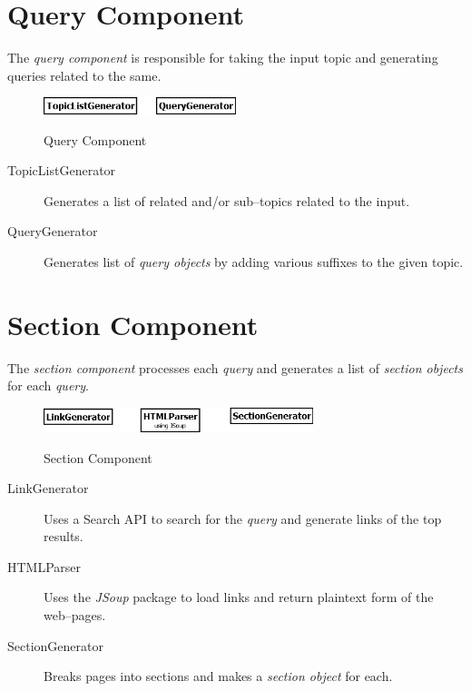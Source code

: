 \documentclass[a4paper,10pt]{report}
\begin{document}
\clearpage


\section{Query Component}

The \emph{query component} is responsible for taking the input topic and generating queries related to the same. \\
\begin{figure}[h!]
\centering
\includegraphics[width=0.50\textwidth]{./diagrams/Query}\\
\caption{Query Component}
\end{figure}

\begin{description}
	\item[TopicListGenerator] Generates a list of related and/or sub--topics related to the input.
	\item[QueryGenerator] Generates list of \emph{query objects} by adding various suffixes to the given topic.
\end{description}


\section{Section Component}

The \emph{section component} processes each \emph{query} and generates a list of \emph{section objects} for each \emph{query}. \\

\begin{figure}[h!]
\centering
\includegraphics[width=0.70\textwidth]{./diagrams/Section}\\
\caption{Section Component}
\end{figure}

\begin{description}
	\item[LinkGenerator] Uses a Search API to search for the \emph{query} and generate links of the top results.
	\item[HTMLParser] Uses the \emph{JSoup} package to load links and return plaintext form of the web--pages.
	\item[SectionGenerator] Breaks pages into sections and makes a \emph{section object} for each.
\end{description}
\end{document}
